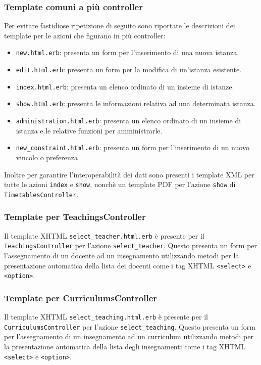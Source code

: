 \documentclass[11pt,a4paper]{article}
\begin{document}
\subsubsection*{Template comuni a più controller}
Per evitare fastidiose ripetizione di seguito sono riportate le descrizioni dei template per le azioni che figurano in più controller:
\begin{itemize}
 \item \verb|new.html.erb|: presenta un form per l'inserimento di una nuova istanza.
 \item \verb|edit.html.erb|: presenta un form per la modifica di un'istanza esistente.
 \item \verb|index.html.erb|: presenta un elenco ordinato di un insieme di istanze.
 \item \verb|show.html.erb|: presenta le informazioni relativa ad una determinata istanza.
 \item \verb|administration.html.erb|: presenta un elenco ordinato di un insieme di istanza e le relative funzioni
 per amministrarle.
 \item \verb|new_constraint.html.erb|: presenta un form per l'inserimento di un nuovo vincolo o preferenza
\end{itemize}
Inoltre per garantire l'interoperabilità dei dati sono presenti i template XML per tutte le azioni \verb|index| e \verb|show|, nonchè un template PDF per l'azione \verb|show| di \verb|TimetablesController|.
\subsubsection*{Template per TeachingsController}
Il template XHTML \verb|select_teacher.html.erb| è presente per il \\ \verb|TeachingsController| per l'azione \verb|select_teacher|.  Questo presenta un form per l'assegnamento di un docente ad un insegnamento utilizzando metodi per la presentazione automatica della lista dei docenti come i tag XHTML \verb|<select>| e \verb|<option>|.
\subsubsection*{Template per CurriculumsController}
Il template XHTML \verb|select_teaching.html.erb| è presente per il \\ \verb|CurriculumsController| per l'azione \verb|select_teaching|.  Questo presenta un form per l'assegnamento di un insegnamento ad un curriculum utilizzando metodi per la presentazione automatica della lista degli insegnamenti come i tag XHTML \verb|<select>| e \verb|<option>|.
\end{document}
